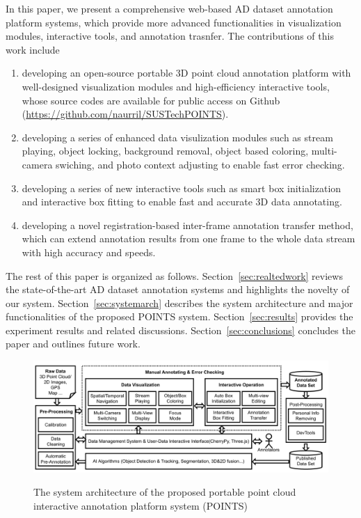 \documentclass[letterpaper, 10 pt, conference]{ieeeconf}  %
\begin{document}
In this paper, we present a comprehensive web-based AD dataset annotation platform systems, which provide more advanced functionalities in visualization modules, interactive tools, and annotation trasnfer. The contributions of this work include
\begin{enumerate}
	\item developing an open-source portable 3D point cloud annotation platform with well-designed visualization modules and high-efficiency interactive tools, whose source codes are available for public access on Github (\url{https://github.com/naurril/SUSTechPOINTS}).
	\item developing a series of enhanced data visulization modules such as stream playing, object locking, background removal, object based coloring, multi-camera
swiching, and photo context adjusting to enable fast error checking.
	\item developing a series of new interactive tools such as smart box initialization and interactive box fitting to enable fast and accurate 3D data annotating.
	\item developing a novel registration-based inter-frame annotation transfer method, which can extend annotation results from one frame to the whole data stream with high accuracy and speeds.

\end{enumerate}



The rest of this paper is organized as follows. 
Section~\ref{sec:realtedwork}  reviews the state-of-the-art AD dataset annotation systems and highlights the novelty of our system. 
Section~\ref{sec:systemarch} describes the system architecture and major functionalities of the proposed POINTS system. 
Section~\ref{sec:results} provides the experiment results and related discussions. 
Section~\ref{sec:conclusions} concludes the paper and outlines future work.





\begin{figure}[t]
	
	\centering
	\vspace{-0.1cm}
	\includegraphics[width=1.0\linewidth]{./arch-big}\\ %
	\caption{The system architecture of the proposed portable point cloud interactive annotation platform system (POINTS)}
	\label{fig:arch_layer}
\end{figure}
\end{document}

